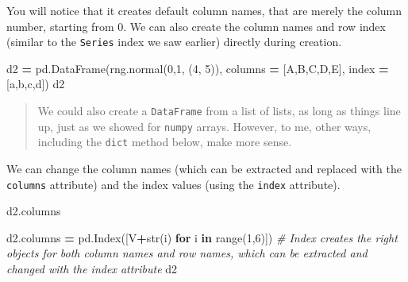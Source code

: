 \documentclass[
  letterpaper,
]{scrbook}
\newenvironment{Shaded}{\begin{snugshade}}{\end{snugshade}}
\newcommand{\BuiltInTok}[1]{#1}
\newcommand{\CommentTok}[1]{\textcolor[rgb]{0.56,0.35,0.01}{\textit{#1}}}
\newcommand{\ControlFlowTok}[1]{\textcolor[rgb]{0.13,0.29,0.53}{\textbf{#1}}}
\newcommand{\DecValTok}[1]{\textcolor[rgb]{0.00,0.00,0.81}{#1}}
\newcommand{\KeywordTok}[1]{\textcolor[rgb]{0.13,0.29,0.53}{\textbf{#1}}}
\newcommand{\NormalTok}[1]{#1}
\newcommand{\OperatorTok}[1]{\textcolor[rgb]{0.81,0.36,0.00}{\textbf{#1}}}
\newcommand{\StringTok}[1]{\textcolor[rgb]{0.31,0.60,0.02}{#1}}
\begin{document}
You will notice that it creates default column names, that are merely the column number, starting from 0. We can also create the column names and row index (similar to the \texttt{Series} index we saw earlier) directly during creation.

\begin{Shaded}
\begin{Highlighting}[]
\NormalTok{d2 }\OperatorTok{=}\NormalTok{ pd.DataFrame(rng.normal(}\DecValTok{0}\NormalTok{,}\DecValTok{1}\NormalTok{, (}\DecValTok{4}\NormalTok{, }\DecValTok{5}\NormalTok{)), }
\NormalTok{                  columns }\OperatorTok{=}\NormalTok{ [}\StringTok{\textquotesingle{}A\textquotesingle{}}\NormalTok{,}\StringTok{\textquotesingle{}B\textquotesingle{}}\NormalTok{,}\StringTok{\textquotesingle{}C\textquotesingle{}}\NormalTok{,}\StringTok{\textquotesingle{}D\textquotesingle{}}\NormalTok{,}\StringTok{\textquotesingle{}E\textquotesingle{}}\NormalTok{], }
\NormalTok{                  index }\OperatorTok{=}\NormalTok{ [}\StringTok{\textquotesingle{}a\textquotesingle{}}\NormalTok{,}\StringTok{\textquotesingle{}b\textquotesingle{}}\NormalTok{,}\StringTok{\textquotesingle{}c\textquotesingle{}}\NormalTok{,}\StringTok{\textquotesingle{}d\textquotesingle{}}\NormalTok{])}
\NormalTok{d2}
\end{Highlighting}
\end{Shaded}

\begin{quote}
We could also create a \texttt{DataFrame} from a list of lists, as long as things line up, just as we showed for \texttt{numpy} arrays. However, to me, other ways, including the \texttt{dict} method below, make more sense.
\end{quote}

We can change the column names (which can be extracted and replaced with the \texttt{columns} attribute) and the index values (using the \texttt{index} attribute).

\begin{Shaded}
\begin{Highlighting}[]
\NormalTok{d2.columns}
\end{Highlighting}
\end{Shaded}

\begin{Shaded}
\begin{Highlighting}[]
\NormalTok{d2.columns }\OperatorTok{=}\NormalTok{ pd.Index([}\StringTok{\textquotesingle{}V\textquotesingle{}}\OperatorTok{+}\BuiltInTok{str}\NormalTok{(i) }\ControlFlowTok{for}\NormalTok{ i }\KeywordTok{in} \BuiltInTok{range}\NormalTok{(}\DecValTok{1}\NormalTok{,}\DecValTok{6}\NormalTok{)]) }\CommentTok{\# Index creates the right objects for both column names and row names, which can be extracted and changed with the \textasciigrave{}index\textasciigrave{} attribute}
\NormalTok{d2}
\end{Highlighting}
\end{Shaded}
\end{document}
